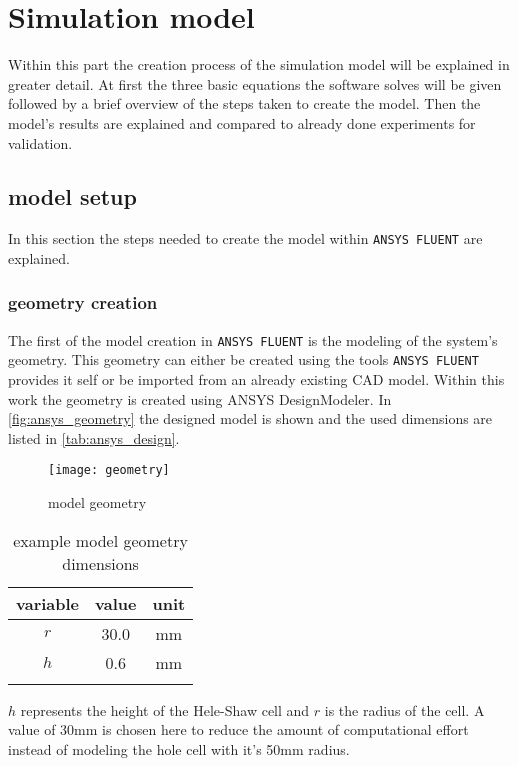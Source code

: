 \documentclass[../thesis.tex]{subfiles}
\begin{document}
\chapter{Simulation model}
\label{chp:model}

Within this part the creation process of the simulation model will be explained in greater detail. At first the three basic equations the software solves will be given followed by a brief overview of the steps taken to create the model. Then the model's results are explained and compared to already done experiments for validation.

\section{model setup}
\label{sec:mod_setup}

In this section the steps needed to create the model within \texttt{ANSYS FLUENT} are explained.

\subsection{geometry creation}
The first of the model creation in \texttt{ANSYS FLUENT} is the modeling of the system's geometry. This geometry can either be created using the tools \texttt{ANSYS FLUENT} provides it self or be imported from an already existing CAD model. Within this work the geometry is created using ANSYS DesignModeler. In \autoref{fig:ansys_geometry} the designed model is shown and the used dimensions are listed in \autoref{tab:ansys_design}.

\begin{figure}[htbp]
	\centering
	\texttt{[image: geometry]}
	\caption{model geometry}
	\label{fig:ansys_geometry}
\end{figure}

\begin{table} [htb]
	\centering
	\caption{example model geometry dimensions}
	\begin{tabular}{ ccc }
		\hline
		variable & value & unit \\
		\hline
		$r$ & 30.0 & mm \\
		$h$ & 0.6 & mm \\
		\hline
		\label{tab:ansys_design}
	\end{tabular}
\end{table}

$h$ represents the height of the Hele-Shaw cell and $r$ is the radius of the cell. A value of 30mm is chosen here to reduce the amount of computational effort instead of modeling the hole cell with it's 50mm radius.
\end{document}
